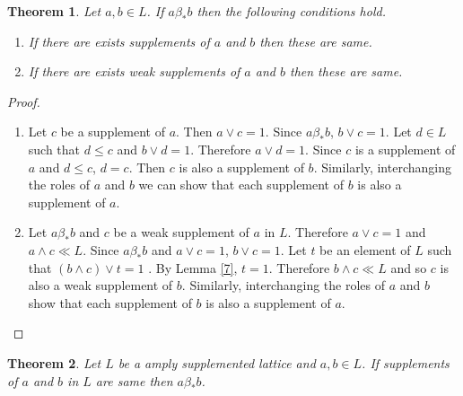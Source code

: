 \documentclass[a4paper,12pt]{article}
\newtheorem{theorem}{Theorem}[section]
\numberwithin{equation}{section}
\begin{document}
\begin{theorem}\label{8}
  Let $ a,b \in L $. If $ a\beta_* b $ then the following conditions hold.
  \begin{enumerate}[label=(\roman{*}), ref=(\roman{*})]
    \item
      If there are exists supplements of $ a $ and $ b $ then these are same. \label{8.1}
    \item
      If there are exists weak supplements of $ a $ and $ b $ then these are same. \label{8.2}
  \end{enumerate}
\end{theorem}
\begin{proof}
  \begin{enumerate}
    \item
      Let $ c $ be a supplement of $ a $. Then $ a \vee c = 1 $. Since $ a \beta_* b $, $ b \vee c=1 $.
      Let $ d \in L $ such that $ d \leq c $ and $ b \vee d = 1 $. Therefore 
      $ a \vee d = 1 $. Since $ c $ is a supplement of $ a $ and $ d \leq c $, $ d = c $. Then 
      $ c $ is also a supplement of $ b $. Similarly, interchanging the roles of $ a $ and $ b $ 
      we can show that each supplement of $ b $ is also a supplement of $ a $.
    \item
      Let $ a \beta_* b $ and $ c $ be a weak supplement of $ a $ in $ L $. Therefore $ a \vee c = 1 $ 
      and $ a \wedge c \ll L $. Since $ a \beta_* b $ and $ a \vee c = 1 $, $ b \vee c = 1 $. 
      Let $ t $ be an element of $ L $ such that $ (b \wedge c ) \vee t = 1 $ . By Lemma \ref{7}, 
      $ t = 1 $. Therefore $ b \wedge c \ll L $ and so $ c $ is also a weak supplement of $ b $. 
      Similarly, interchanging the roles of $ a $ and $ b $ show that each supplement of $ b $ 
      is also a supplement of $ a $.
  \end{enumerate}
\end{proof}




\begin{theorem}\label{9}
  Let $ L $ be a amply supplemented lattice and $ a,b \in L $. If supplements of $ a $ and $ b $ in $ L $ 
  are same then $ a \beta_* b $.
\end{theorem}
\end{document}

